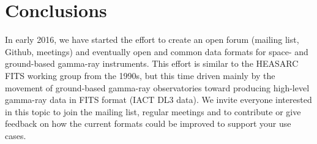 \section{Conclusions}

In early 2016, we have started the \gadf effort to create an open forum (mailing list, Github, meetings) and eventually open and common data formats for space- and ground-based gamma-ray instruments. This effort is similar to the HEASARC FITS working group from the 1990s, but this time driven mainly by the movement of ground-based gamma-ray observatories toward producing high-level gamma-ray data in FITS format (IACT DL3 data). %
We invite everyone interested in this topic to join the mailing list, regular meetings and to contribute or give feedback on how the current formats could be improved to support your use cases.
